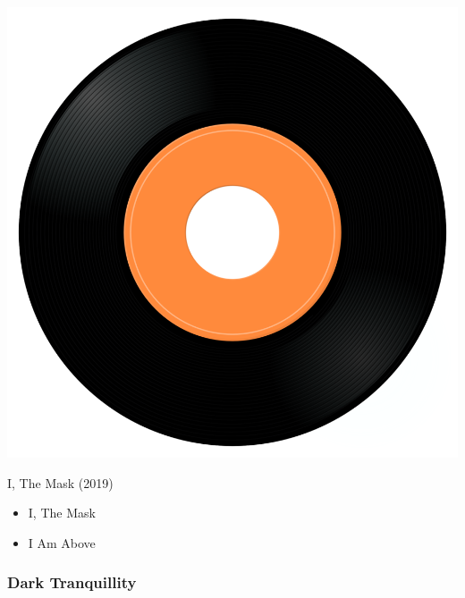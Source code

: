 \begin{minipage}[t]{0.25\textwidth}\vspace{0pt}
\captionsetup{type=figure}
\includegraphics[width=\textwidth]{Images/cover.png}
\caption*{I, The Mask (2019)}
\end{minipage}
\begin{minipage}[t]{0.25\textwidth}\vspace{0pt}
\begin{itemize}[nosep,leftmargin=1em,labelwidth=*,align=left]
	\setlength{\itemsep}{0pt}
	\item I, The Mask
	\item I Am Above
\end{itemize}
\end{minipage}


\subsubsection{Dark Tranquillity}

